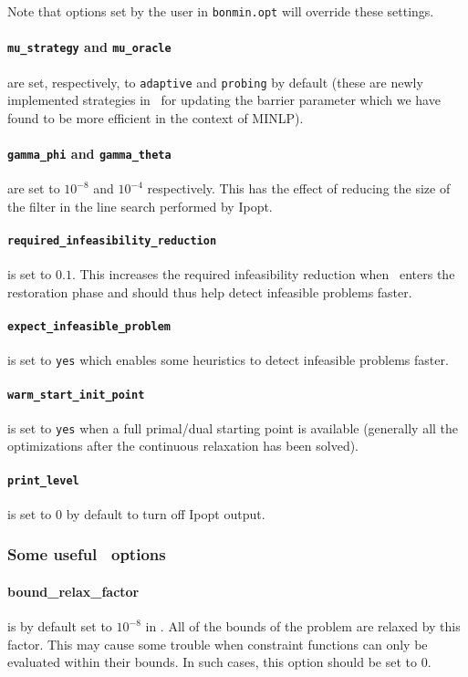 Note that options set by the user in {\tt bonmin.opt} will override these
settings.

\paragraph{{\tt mu\_strategy} and {\tt mu\_oracle}} are set, respectively, to
{\tt adaptive} and {\tt probing} by default (these are newly implemented strategies in \Ipopt\
for updating the barrier parameter  which we have found to be
more efficient in the context of MINLP).
\paragraph{{\tt gamma\_phi} and {\tt gamma\_theta}} are set to $10^{-8}$ and $10^{-4}$
respectively. This has the effect of reducing the size of the filter in the line search performed by Ipopt.

\paragraph{\tt required\_infeasibility\_reduction} is set to $0.1$.
This increases the required infeasibility reduction when \Ipopt\ enters the
restoration phase and should thus help
detect infeasible problems faster.

\paragraph{\tt expect\_infeasible\_problem} is set to {\tt yes} which enables some heuristics
to detect infeasible problems faster.

\paragraph{\tt warm\_start\_init\_point} is set to {\tt yes} when a full primal/dual starting
point is available (generally all the optimizations after the continuous relaxation has been solved).

\paragraph{\tt print\_level} is set to $0$ by default to turn off Ipopt output.
\subsubsection{Some useful \Ipopt\ options}
\paragraph{bound\_relax\_factor} is by default set to $10^{-8}$ in \Ipopt. All of the bounds
of the problem are relaxed by this factor. This may cause some trouble
when constraint functions can only be evaluated within their bounds.
In such cases, this
option should be set to 0.
